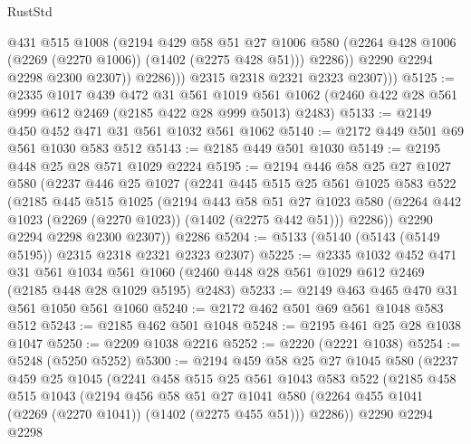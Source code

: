 \begin{lexlean}{RustStd}
\begin{coremodule}
                      @431
                      @515
                      @1008
                      (@2194
                        @429
                        @58
                        @51
                        @27
                        @1006
                        @580
                        (@2264 @428 @1006 (@2269 (@2270 @1006)) (@1402 (@2275 @428 @51)))
                        @2286))
                    @2290
                    @2294
                    @2298
                    @2300
                    @2307))
                @2286)))
          @2315
          @2318
          @2321
          @2323
          @2307)))
@5125 := @2335
    @1017
    @439
    @472
    @31
    @561
    @1019
    @561
    @1062
    (@2460 @422 @28 @561 @999 @612 @2469 (@2185 @422 @28 @999 @5013) @2483)
@5133 := @2149 @450 @452 @471 @31 @561 @1032 @561 @1062
@5140 := @2172 @449 @501 @69 @561 @1030 @583 @512
@5143 := @2185 @449 @501 @1030
@5149 := @2195 @448 @25 @28 @571 @1029 @2224
@5195 := @2194
    @446
    @58
    @25
    @27
    @1027
    @580
    (@2237
      @446
      @25
      @1027
      (@2241
        @445
        @515
        @25
        @561
        @1025
        @583
        @522
        (@2185
          @445
          @515
          @1025
          (@2194
            @443
            @58
            @51
            @27
            @1023
            @580
            (@2264 @442 @1023 (@2269 (@2270 @1023)) (@1402 (@2275 @442 @51)))
            @2286))
        @2290
        @2294
        @2298
        @2300
        @2307))
    @2286
@5204 := @5133 (@5140 (@5143 (@5149 @5195)) @2315 @2318 @2321 @2323 @2307)
@5225 := @2335
    @1032
    @452
    @471
    @31
    @561
    @1034
    @561
    @1060
    (@2460 @448 @28 @561 @1029 @612 @2469 (@2185 @448 @28 @1029 @5195) @2483)
@5233 := @2149 @463 @465 @470 @31 @561 @1050 @561 @1060
@5240 := @2172 @462 @501 @69 @561 @1048 @583 @512
@5243 := @2185 @462 @501 @1048
@5248 := @2195 @461 @25 @28 @1038 @1047
@5250 := @2209 @1038 @2216
@5252 := @2220 (@2221 @1038)
@5254 := @5248 (@5250 @5252)
@5300 := @2194
    @459
    @58
    @25
    @27
    @1045
    @580
    (@2237
      @459
      @25
      @1045
      (@2241
        @458
        @515
        @25
        @561
        @1043
        @583
        @522
        (@2185
          @458
          @515
          @1043
          (@2194
            @456
            @58
            @51
            @27
            @1041
            @580
            (@2264 @455 @1041 (@2269 (@2270 @1041)) (@1402 (@2275 @455 @51)))
            @2286))
        @2290
        @2294
        @2298

\end{coremodule}
\end{lexlean}
